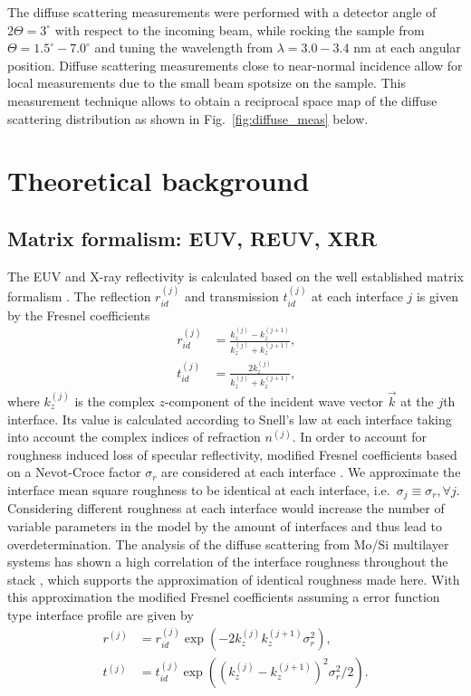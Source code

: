 The diffuse scattering measurements were performed with a detector angle of $2\Theta = 3^\circ$ with respect to the incoming beam, while rocking the sample from $\Theta = 1.5^\circ - 7.0^\circ$ and tuning the wavelength from $\lambda = 3.0 - 3.4$ nm at each angular position. Diffuse scattering measurements close to near-normal incidence allow for local measurements due to the small beam spotsize on the sample. This measurement technique allows to obtain a reciprocal space map of the diffuse scattering distribution as shown in Fig.~\ref{fig:diffuse_meas} below.


\section{Theoretical background} \label{sec:matrix_formalism}

\subsection{Matrix formalism: EUV, REUV, XRR} \label{subsec:matrix_formalism}

The EUV and X-ray reflectivity is calculated based on the well established matrix formalism \cite{PrinciplesOfOptics}. The reflection $r_{id}^{(j)}$  and transmission $t_{id}^{(j)}$ at each interface $j$ is given by the Fresnel coefficients
\begin{align}
        r_{id}^{(j)} &= \frac{k_z^{(j)} - k_z^{(j+1)}}{k_z^{(j)} + k_z^{(j+1)}}\text{,} \\
        t_{id}^{(j)} &= \frac{2 k_z^{(j)}}{k_z^{(j)} + k_z^{(j+1)}}\text{,} 
\end{align}
where $k_z^{(j)}$ is the complex $z$-component of the incident wave vector $\vec{k}$ at the $j$th interface. Its value is calculated according to Snell's law at each interface taking into account the complex indices of refraction $n^{(j)}$.
In order to account for roughness induced loss of specular reflectivity, modified Fresnel coefficients based on a Nevot-Croce factor $\sigma_r$ are considered at each interface \cite{nevot_croece}. We approximate the interface mean square roughness to be identical at each interface, i.e.~$\sigma_j \equiv \sigma_r\text{,} \, \forall j$. Considering different roughness at each interface would increase the number of variable parameters in the model by the amount of interfaces and thus lead to overdetermination. The analysis of the diffuse scattering from Mo/Si multilayer systems has shown a high correlation of the interface roughness throughout the stack \cite{Haase:14}, which supports the approximation of identical roughness made here. With this approximation the modified Fresnel coefficients assuming a error function type interface profile are given by
\begin{align}
        r^{(j)} &= r_{id}^{(j)} \exp(-2 k_z^{(j)} k_z^{(j+1)} \sigma_r^2)\text{,} \nonumber \\
        t^{(j)} &= t_{id}^{(j)} \exp((k_z^{(j)} - k_z^{(j+1)})^2 \sigma_r^2/2) \text{.} \label{eqn:modified_fresnel}
\end{align}

